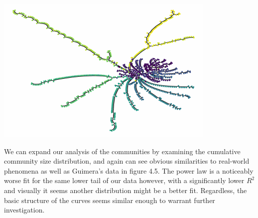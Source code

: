 \documentclass[12pt,twoside]{report}
\begin{document}
\begin{center}
\begin{minipage}{0.45\linewidth}
\end{minipage}%
\hfill
\begin{minipage}{0.45\linewidth}
\includegraphics[width=\linewidth]{figures/1500_dendro.png}
\end{minipage}
\end{center} 

\vspace{1pt}


We can expand our analysis of the communities by examining the cumulative community size distribution, and again can see obvious similarities to real-world phenomena as well as Guimera's data in figure 4.5. The power law is a noticeably worse fit for the same lower tail of our data however, with a significantly lower $R^2$ and visually it seems another distribution might be a better fit. Regardless, the basic structure of the curves seems similar enough to warrant further investigation. \\
\end{document}
